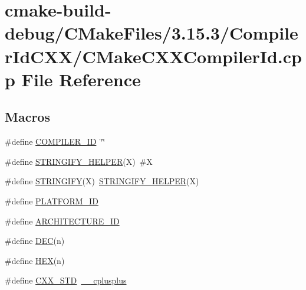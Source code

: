 \hypertarget{cmake-build-debug_2CMakeFiles_23_815_83_2CompilerIdCXX_2CMakeCXXCompilerId_8cpp}{}\section{cmake-\/build-\/debug/\+C\+Make\+Files/3.15.3/\+Compiler\+Id\+C\+X\+X/\+C\+Make\+C\+X\+X\+Compiler\+Id.cpp File Reference}
\label{cmake-build-debug_2CMakeFiles_23_815_83_2CompilerIdCXX_2CMakeCXXCompilerId_8cpp}
\subsection*{Macros}
\begin{DoxyCompactItemize}
\item 
\#define \hyperlink{cmake-build-debug_2CMakeFiles_23_815_83_2CompilerIdCXX_2CMakeCXXCompilerId_8cpp_a81dee0709ded976b2e0319239f72d174}{C\+O\+M\+P\+I\+L\+E\+R\+\_\+\+ID}~\char`\"{}\char`\"{}
\item 
\#define \hyperlink{cmake-build-debug_2CMakeFiles_23_815_83_2CompilerIdCXX_2CMakeCXXCompilerId_8cpp_a2ae9b72bb13abaabfcf2ee0ba7d3fa1d}{S\+T\+R\+I\+N\+G\+I\+F\+Y\+\_\+\+H\+E\+L\+P\+ER}(X)~\#X
\item 
\#define \hyperlink{cmake-build-debug_2CMakeFiles_23_815_83_2CompilerIdCXX_2CMakeCXXCompilerId_8cpp_a43e1cad902b6477bec893cb6430bd6c8}{S\+T\+R\+I\+N\+G\+I\+FY}(X)~\hyperlink{cmake-build-debug_2CMakeFiles_23_815_83_2CompilerIdCXX_2CMakeCXXCompilerId_8cpp_a2ae9b72bb13abaabfcf2ee0ba7d3fa1d}{S\+T\+R\+I\+N\+G\+I\+F\+Y\+\_\+\+H\+E\+L\+P\+ER}(X)
\item 
\#define \hyperlink{cmake-build-debug_2CMakeFiles_23_815_83_2CompilerIdCXX_2CMakeCXXCompilerId_8cpp_adbc5372f40838899018fadbc89bd588b}{P\+L\+A\+T\+F\+O\+R\+M\+\_\+\+ID}
\item 
\#define \hyperlink{cmake-build-debug_2CMakeFiles_23_815_83_2CompilerIdCXX_2CMakeCXXCompilerId_8cpp_aba35d0d200deaeb06aee95ca297acb28}{A\+R\+C\+H\+I\+T\+E\+C\+T\+U\+R\+E\+\_\+\+ID}
\item 
\#define \hyperlink{cmake-build-debug_2CMakeFiles_23_815_83_2CompilerIdCXX_2CMakeCXXCompilerId_8cpp_ad1280362da42492bbc11aa78cbf776ad}{D\+EC}(n)
\item 
\#define \hyperlink{cmake-build-debug_2CMakeFiles_23_815_83_2CompilerIdCXX_2CMakeCXXCompilerId_8cpp_a46d5d95daa1bef867bd0179594310ed5}{H\+EX}(n)
\item 
\#define \hyperlink{cmake-build-debug_2CMakeFiles_23_815_83_2CompilerIdCXX_2CMakeCXXCompilerId_8cpp_a34cc889e576a1ae6c84ae9e0a851ba21}{C\+X\+X\+\_\+\+S\+TD}~\hyperlink{cmake-build-debug_2babel__client__autogen_2moc__predefs_8h_a1b391bc7ed92f79666c4a5d840aa1edd}{\+\_\+\+\_\+cplusplus}
\end{DoxyCompactItemize}
